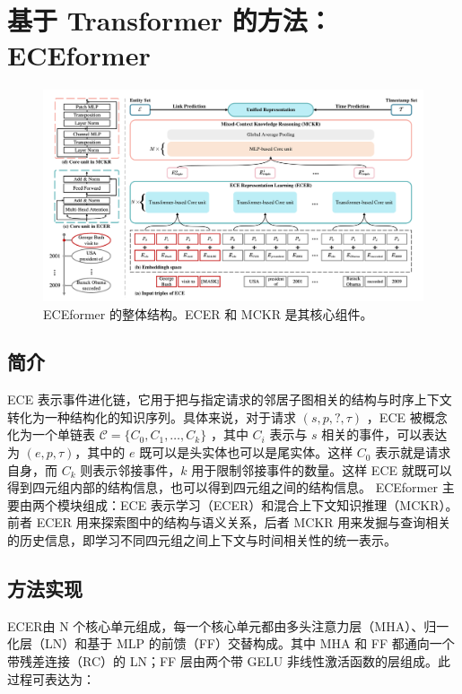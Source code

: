 \documentclass[a4paper, AutoFakeBold]{article}
\begin{document}
\section{基于 Transformer 的方法：ECEformer}



\begin{figure}
	\captionsetup{width=0.85\textwidth}
	\centering
	\includegraphics[width=1.0\textwidth]{figures/ECEformer.png}
	\caption{ECEformer 的整体结构\cite{6-2024RefBlue}。ECER 和 MCKR 是其核心组件。}
	\label{fig:enter-label}
\end{figure}



\subsection{简介}

ECE 表示事件进化链，它用于把与指定请求的邻居子图相关的结构与时序上下文转化为一种结构化的知识序列。具体来说，对于请求 $(s,p,?,\tau)$ ，ECE 被概念化为一个单链表 ${\mathcal C}=\{C_0,C_1,\dots,C_k\}$ ，其中 $C_i$ 表示与 $s$ 相关的事件，可以表达为 $(e,p,\tau)$，其中的 $e$ 既可以是头实体也可以是尾实体。这样 $C_0$ 表示就是请求自身，而 $C_k$ 则表示邻接事件，$k$ 用于限制邻接事件的数量。这样 ECE 就既可以得到四元组内部的结构信息，也可以得到四元组之间的结构信息。
ECEformer 主要由两个模块组成：ECE 表示学习（ECER）和混合上下文知识推理（MCKR）。前者 ECER 用来探索图中的结构与语义关系，后者 MCKR 用来发掘与查询相关的历史信息，即学习不同四元组之间上下文与时间相关性的统一表示。


\subsection{方法实现}

ECER由 N 个核心单元组成，每一个核心单元都由多头注意力层（MHA）、归一化层（LN）和基于 MLP 的前馈（FF）交替构成。其中 MHA 和 FF 都通向一个带残差连接（RC）的 LN；FF 层由两个带 GELU 非线性激活函数的层组成。此过程可表达为：
\end{document}
